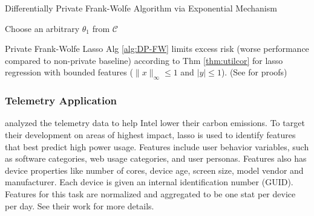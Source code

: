\documentclass[12pt,letterpaper]{article}
\begin{document}
\begin{algorithm}[H]
    \DontPrintSemicolon
    \caption{Differentially Private Frank-Wolfe Algorithm via Exponential Mechanism}
    \label{alg:DP-FW}
    
    Choose an arbitrary $\theta_{1}$ from $\mathcal{C}$\;
    
    
    \;
\end{algorithm}

\cite{NIPS2015_52d080a3} Private Frank-Wolfe Lasso Alg \ref{alg:DP-FW} limits excess risk (worse performance compared to non-private baseline) according to Thm \ref{thm:utilcor} for lasso regression with bounded features ($\|x\|_{\infty} \leq 1$ and $|y| \leq 1$). (See \cite{lassocarbon} for proofs)


\subsubsection{Telemetry Application}

\citeauthor{lassocarbon} analyzed the telemetry data to help Intel lower their carbon emissions. To target their development on areas of highest impact, lasso is used to identify features that best predict high power usage. Features include user behavior variables, such as software categories, web usage categories, and user personas. Features also has device properties like number of cores, device age, screen size, model vendor and manufacturer. Each device is given an internal identification number (GUID). Features for this task are normalized and aggregated to be one stat per device per day. See their work for more details. 
\end{document}
